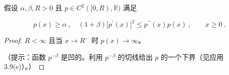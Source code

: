 \exerciseshead

\begin{exercises}
\item

假设 $ \alpha, \beta, R > 0 $ 且 $ p \in C^2([0, R), \mathbb{R}) $ 满足

\[
p(x)\geq\alpha~,\quad(1+\beta)\big[p^{\prime}(x)\big]^{2}\leq p^{\prime\prime}(x)p(x)~,\qquad x\geq0~.
\]
\end{exercises}

\begin{proof}

$ R < \infty $ 且当 $ x \to R^{-} $ 时 $ p(x) \to \infty $。

（提示：函数 $ p^{-\beta} $ 是凹的。利用 $ p^{-\beta} $ 的切线给出 $ p $ 的一个下界（见应用 3.9(e)）。）

\end{proof}

